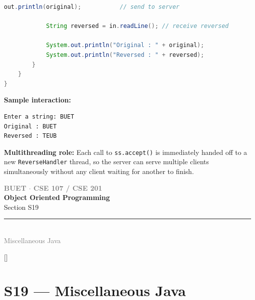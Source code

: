 \documentclass[12pt,a3paper]{article}
\newcommand{\secdivider}[4]{%
  \newpage\thispagestyle{empty}%
  \vspace*{\fill}%
  \begin{tcolorbox}[enhanced,colback=#4!7,colframe=#3,boxrule=1.5pt,arc=8pt,
    left=20pt,right=20pt,top=22pt,bottom=22pt,
    shadow={3pt}{-3pt}{0pt}{black!15}]
    \centering
    {\large\textcolor{gray}{\textbf{BUET $\cdot$ CSE 107 / CSE 201}}}\\[8pt]
    {\fontsize{26}{32}\selectfont\bfseries\textcolor{#3}{Object Oriented Programming}}\\[6pt]
    {\fontsize{15}{19}\selectfont\textcolor{dgray}{#1}}\\[12pt]
    \textcolor{#3!60}{\rule{0.5\textwidth}{0.5pt}}\\[6pt]
    {\small\textcolor{gray}{#2}}
  \end{tcolorbox}%
  \vspace*{\fill}\newpage%
}
\begin{document}
\begin{enumerate}
\begin{tcolorbox}
\begin{lstlisting}[language=Java]
            out.println(original);           // send to server

            String reversed = in.readLine(); // receive reversed

            System.out.println("Original : " + original);
            System.out.println("Reversed : " + reversed);
        }
    }
}
\end{lstlisting}

\medskip
\textbf{Sample interaction:}
\begin{verbatim}
Enter a string: BUET
Original : BUET
Reversed : TEUB
\end{verbatim}

\medskip
\textbf{Multithreading role:} Each call to
\texttt{ss.accept()} is immediately handed off to a
new \texttt{ReverseHandler} thread, so the server
can serve multiple clients simultaneously without
any client waiting for another to finish.

\end{tcolorbox}


\end{enumerate}
\newpage
\secdivider{Section S19}{Miscellaneous Java}{cC}{cC}
\label{sec:S19}
\titleformat{\section}{\large\bfseries\color{cC}}{}{0em}{}[\titlerule]
\section{S19 --- Miscellaneous Java}
\end{document}
